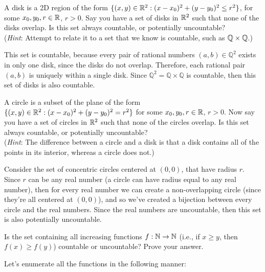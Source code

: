 \documentclass[11pt]{article}
\begin{document}
\begin{Parts}
    \Part
    A disk is a 2D region of the form $\{(x, y) \in \mathbb{R}^2 : (x - x_0)^2 + (y - y_0)^2 \le r^2\}$, for some $x_0, y_0, r \in \mathbb{R}$, $r > 0$.
    Say you have a set of disks in $\mathbb{R}^2$ such that none of the disks overlap.
    Is this set always countable, or potentially uncountable?\\
    (\textit{Hint}: Attempt to relate it to a set that we know is countable, such as $\mathbb{Q} \times \mathbb{Q}$.)

    \begin{solution}
      This set is countable, because every pair of rational numbers $(a, b) \in \mathbb Q^2$ exists in only one disk, since the disks do not overlap. Therefore, each rational pair $(a, b)$ is uniquely within a single disk. Since $\mathbb Q^2 = \mathbb Q \times \mathbb Q $ is countable, then this set of disks is also countable.
    \end{solution}
    
    \Part
    A circle is a subset of the plane of the form $\{(x, y) \in \mathbb{R}^2 : (x - x_0)^2 + (y - y_0)^2 = r^2\}$ for some $x_0, y_0, r \in \mathbb{R}$, $r > 0$. 
    Now say you have a set of circles in $\mathbb{R}^2$ such that none of the circles overlap.
    Is this set always countable, or potentially uncountable?\\
    (\textit{Hint}: The difference between a circle and a disk is that a disk contains all of the points in its interior, whereas a circle does not.)
    
    \begin{solution}
      Consider the set of concentric circles centered at $(0, 0)$, that have radius $r$. Since $r$ can be any real number (a circle can have radius equal to any real number), then for every real number we can create a non-overlapping circle (since they're all centered at $(0, 0)$), and so we've created a bijection between every circle and the real numbers. Since the real numbers are uncountable, then this set is also potentially uncountable.
    \end{solution}
    
    \Part
    Is the set containing all increasing functions $f : \mathbb{N} \rightarrow \mathbb{N}$ (i.e., if $x \geq y $, then $f(x) \geq f(y)$) countable or uncountable? Prove your answer.

    \begin{solution}
      Let's enumerate all the functions in the following manner: 


\end{solution}
\end{Parts}
\end{document}
